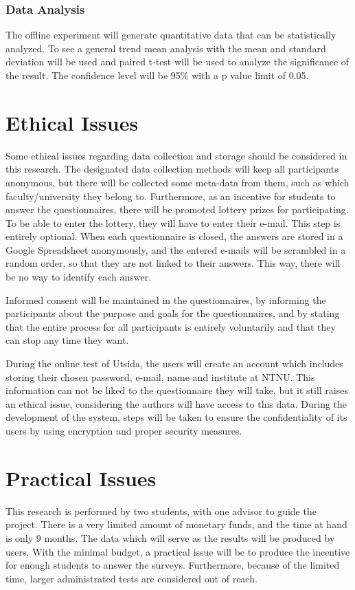 \subsubsection{Data Analysis}
The offline experiment will generate quantitative data that can be statistically analyzed. To see a general trend mean analysis with the mean and standard deviation will be used and paired t-test will be used to analyze the significance of the result. The confidence level will be 95\% with a p value limit of 0.05. 

\section{Ethical Issues}
Some ethical issues regarding data collection and storage should be considered in this research. The designated data collection methods will keep all participants anonymous, but there will be collected some meta-data from them, such as which faculty/university they belong to. Furthermore, as an incentive for students to answer the questionnaires, there will be promoted lottery prizes for participating. To be able to enter the lottery, they will have to enter their e-mail. This step is entirely optional. When each questionnaire is closed, the answers are stored in a Google Spreadsheet anonymously, and the entered e-mails will be scrambled in a random order, so that they are not linked to their answers. This way, there will be no way to identify each answer.

Informed consent will be maintained in the questionnaires, by informing the participants about the purpose and goals for the questionnaires, and by stating that the entire process for all participants is entirely voluntarily and that they can stop any time they want.

During the online test of Utsida, the users will create an account which includes storing their chosen password, e-mail, name and institute at NTNU. This information can not be liked to the questionnaire they will take, but it still raises an ethical issue, considering the authors will have access to this data. During the development of the system, steps will be taken to ensure the confidentiality of its users by using encryption and proper security measures.


\section{Practical Issues}
This research is performed by two students, with one advisor to guide the project. There is a very limited amount of monetary funds, and the time at hand is only 9 months. The data which will serve as the results will be produced by users. With the minimal budget, a practical issue will be to produce the incentive for enough students to answer the surveys. Furthermore, because of the limited time, larger administrated tests are considered out of reach. 

\cleardoublepage